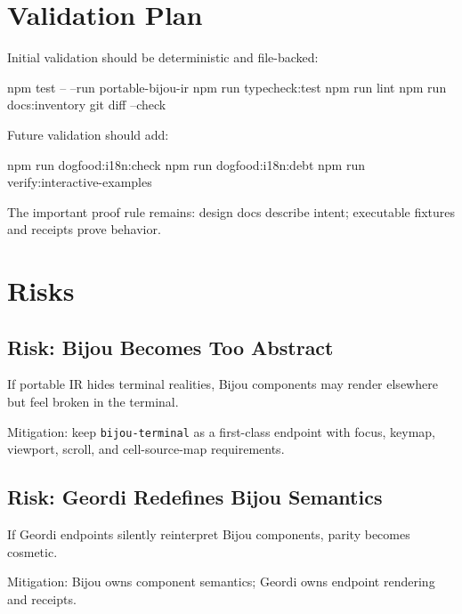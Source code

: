 \section{Validation Plan}\label{record-139-validation-plan}

Initial validation should be deterministic and file-backed:

\begin{CodeBlock}
npm test -- --run portable-bijou-ir
npm run typecheck:test
npm run lint
npm run docs:inventory
git diff --check
\end{CodeBlock}

Future validation should add:

\begin{CodeBlock}
npm run dogfood:i18n:check
npm run dogfood:i18n:debt
npm run verify:interactive-examples
\end{CodeBlock}

The important proof rule remains: design docs describe intent; executable fixtures and receipts prove behavior.

\section{Risks}\label{record-139-risks}

\subsection{Risk: Bijou Becomes Too Abstract}\label{record-139-risk-bijou-becomes-too-abstract}

If portable IR hides terminal realities, Bijou components may render elsewhere but feel broken in the terminal.

Mitigation: keep \texttt{b\allowbreak{}i\allowbreak{}j\allowbreak{}o\allowbreak{}u\allowbreak{}-\allowbreak{}t\allowbreak{}e\allowbreak{}r\allowbreak{}m\allowbreak{}i\allowbreak{}n\allowbreak{}a\allowbreak{}l} as a first-class endpoint with focus, keymap, viewport, scroll, and cell-source-map requirements.

\subsection{Risk: Geordi Redefines Bijou Semantics}\label{record-139-risk-geordi-redefines-bijou-semantics}

If Geordi endpoints silently reinterpret Bijou components, parity becomes cosmetic.

Mitigation: Bijou owns component semantics; Geordi owns endpoint rendering and receipts.


